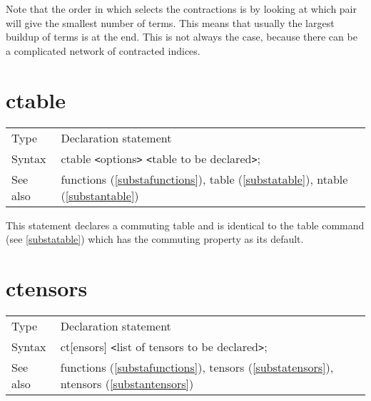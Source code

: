 

\noindent Note that the order in which {\FORM} selects the contractions is by 
looking at which pair will give the smallest number of terms. This means 
that usually the largest buildup of terms is at the end. This is not always 
the case, because there can be a complicated network of contracted indices. 
\vspace{10mm}


\section{ctable}
\label{substactable}

\noindent \begin{tabular}{ll}
Type & Declaration statement\\
Syntax & ctable {\tt<}options{\tt>} {\tt<}table to be 
declared{\tt>}; \\
See also & functions (\ref{substafunctions}), table (\ref{substatable}),
        ntable (\ref{substantable})
\end{tabular} \vspace{4mm}

\noindent This statement declares a commuting 
table and is identical to the table command (see 
\ref{substatable}) which has the commuting property as its default. 
\vspace{10mm}

 
\section{ctensors}
\label{substactensors}

\noindent \begin{tabular}{ll}
Type & Declaration statement\\
Syntax & ct[ensors] {\tt<}list of tensors to be declared{\tt>}; \\
See also & functions (\ref{substafunctions}), tensors 
        (\ref{substatensors}), ntensors (\ref{substantensors})
\end{tabular} \vspace{4mm}

